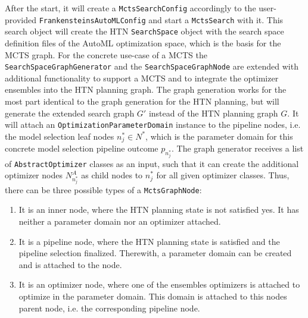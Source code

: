 After the start, it will create a \texttt{MctsSearchConfig} accordingly to the user-provided \texttt{FrankensteinsAutoMLConfig} and start a \texttt{MctsSearch} with it.
This search object will create the HTN \texttt{SearchSpace} object with the search space definition files of the AutoML optimization space, which is the basis for the MCTS graph.\newline
For the concrete use-case of a MCTS the \texttt{SearchSpaceGraphGenerator} and the \texttt{SearchSpaceGraphNode} are extended with additional functionality to support a MCTS and to integrate the optimizer ensembles into the HTN planning graph.
The graph generation works for the most part identical to the graph generation for the HTN planning, but will generate the extended search graph $G'$ instead of the HTN planning graph $G$.
It will attach an \texttt{OptimizationParameterDomain} instance to the pipeline nodes, i.e. the model selection leaf nodes $n^*_j \in N^*$, which is the parameter domain for this concrete model selection pipeline outcome $p_{n^*_j}$.
The graph generator receives a list of \texttt{AbstractOptimizer} classes as an input, such that it can create the additional optimizer nodes $N^A_{n^*_j}$ as child nodes to $n^*_j$ for all given optimizer classes.\newline
Thus, there can be three possible types of a \texttt{MctsGraphNode}:
\begin{enumerate}
    \item It is an inner node, where the HTN planning state is not satisfied yes. It has neither a parameter domain nor an optimizer attached.
    \item It is a pipeline node, where the HTN planning state is satisfied and the pipeline selection finalized. Therewith, a parameter domain can be created and is attached to the node.
    \item It is an optimizer node, where one of the ensembles optimizers is attached to optimize in the parameter domain. This domain is attached to this nodes parent node, i.e. the corresponding pipeline node.
\end{enumerate}

